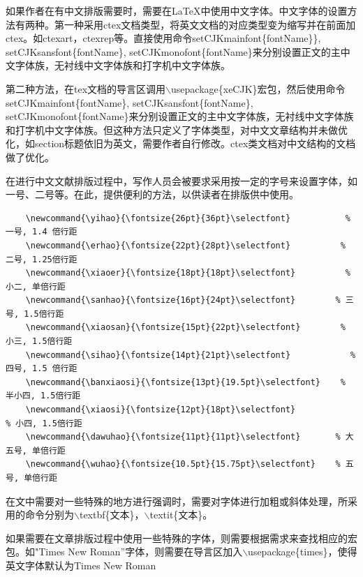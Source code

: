 \documentclass[12pt]{book}
\begin{document}
如果作者在有中文排版需要时，需要在\LaTeX{}中使用中文字体。中文字体的设置方法有两种。第一种采用ctex文档类型，将英文文档的对应类型变为缩写并在前面加ctex。如ctexart，ctexrep等。直接使用命令setCJKmainfont\{fontName\}\}, setCJKsansfont\{fontName\}, setCJKmonofont\{fontName\}来分别设置正文的主中文字体族，无衬线中文字体族和打字机中文字体族。

第二种方法，在tex文档的导言区调用$\backslash$usepackage\{xeCJK\}宏包，然后使用命令setCJKmainfont\{fontName\}, setCJKsansfont\{fontName\}, setCJKmonofont\{fontName\}来分别设置正文的主中文字体族，无衬线中文字体族和打字机中文字体族。但这种方法只定义了字体类型，对中文文章结构并未做优化，如section标题依旧为英文，需要作者自行修改。ctex类文档对中文结构的文档做了优化。

在进行中文文献排版过程中，写作人员会被要求采用按一定的字号来设置字体，如一号、二号等。在此，提供便利的方法，以供读者在排版供中使用。

\begin{verbatim}
    \newcommand{\yihao}{\fontsize{26pt}{36pt}\selectfont}           % 一号, 1.4 倍行距
    \newcommand{\erhao}{\fontsize{22pt}{28pt}\selectfont}          % 二号, 1.25倍行距
    \newcommand{\xiaoer}{\fontsize{18pt}{18pt}\selectfont}          % 小二, 单倍行距
    \newcommand{\sanhao}{\fontsize{16pt}{24pt}\selectfont}        % 三号, 1.5倍行距
    \newcommand{\xiaosan}{\fontsize{15pt}{22pt}\selectfont}        % 小三, 1.5倍行距
    \newcommand{\sihao}{\fontsize{14pt}{21pt}\selectfont}            % 四号, 1.5 倍行距
    \newcommand{\banxiaosi}{\fontsize{13pt}{19.5pt}\selectfont}    % 半小四, 1.5倍行距
    \newcommand{\xiaosi}{\fontsize{12pt}{18pt}\selectfont}            % 小四, 1.5倍行距
    \newcommand{\dawuhao}{\fontsize{11pt}{11pt}\selectfont}       % 大五号, 单倍行距
    \newcommand{\wuhao}{\fontsize{10.5pt}{15.75pt}\selectfont}    % 五号, 单倍行距
\end{verbatim}

在文中需要对一些特殊的地方进行强调时，需要对字体进行加粗或斜体处理，所采用的命令分别为$\backslash$textbf\{文本\}，$\backslash$textit\{文本\}。


如果需要在文章排版过程中使用一些特殊的字体，则需要根据需求来查找相应的宏包。如"Times New Roman”字体，则需要在导言区加入$\backslash$usepackage\{times\}，使得英文字体默认为Times New Roman
\end{document}
